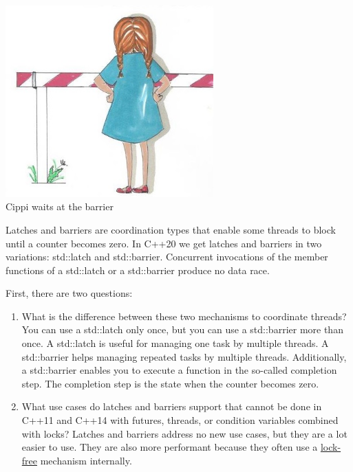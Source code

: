 \begin{center}
\includegraphics[width=0.6\textwidth]{content/3/chapter6/images/18.png}\\
Cippi waits at the barrier
\end{center}

Latches and barriers are coordination types that enable some threads to block until a counter becomes zero. In C++20 we get latches and barriers in two variations: std::latch and std::barrier. Concurrent invocations of the member functions of a std::latch or a std::barrier produce no data race.

First, there are two questions:

\begin{enumerate}
\item 
What is the difference between these two mechanisms to coordinate threads? You can use a std::latch only once, but you can use a std::barrier more than once. A std::latch is useful for managing one task by multiple threads. A std::barrier helps managing repeated tasks by multiple threads. Additionally, a std::barrier enables you to execute a function in the so-called completion step. The completion step is the state when the counter becomes zero.

\item 
What use cases do latches and barriers support that cannot be done in C++11 and C++14 with futures, threads, or condition variables combined with locks? Latches and barriers address no new use cases, but they are a lot easier to use. They are also more performant because they often use a \href{https://en.wikipedia.org/wiki/Non-blocking_algorithm}{lock-free} mechanism internally.
\end{enumerate}


